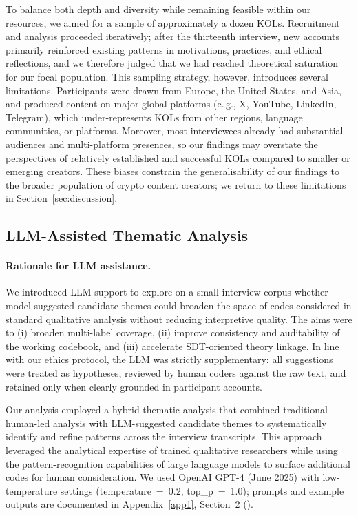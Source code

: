 To balance both depth and diversity while remaining feasible within our resources, we aimed for a sample of approximately a dozen KOLs. Recruitment and analysis proceeded iteratively; after the thirteenth interview, new accounts primarily reinforced existing patterns in motivations, practices, and ethical reflections, and we therefore judged that we had reached theoretical saturation for our focal population. This sampling strategy, however, introduces several limitations. Participants were drawn from Europe, the United States, and Asia, and produced content on major global platforms (e.\,g., X, YouTube, LinkedIn, Telegram), which under-represents KOLs from other regions, language communities, or platforms. Moreover, most interviewees already had substantial audiences and multi-platform presences, so our findings may overstate the perspectives of relatively established and successful KOLs compared to smaller or emerging creators. These biases constrain the generalisability of our findings to the broader population of crypto content creators; we return to these limitations in Section~\ref{sec:discussion}.



\subsection{LLM-Assisted Thematic Analysis}

\paragraph{Rationale for LLM assistance.}
We introduced LLM support to explore on a small interview corpus whether model-suggested candidate themes could broaden the space of codes considered in standard qualitative analysis without reducing interpretive quality. The aims were to (i) broaden multi-label coverage, (ii) improve consistency and auditability of the working codebook, and (iii) accelerate SDT-oriented theory linkage. In line with our ethics protocol, the LLM was strictly supplementary: all suggestions were treated as hypotheses, reviewed by human coders against the raw text, and retained only when clearly grounded in participant accounts.

Our analysis employed a hybrid thematic analysis that combined traditional human-led analysis with LLM-suggested candidate themes to systematically identify and refine patterns across the interview transcripts. This approach leveraged the analytical expertise of trained qualitative researchers while using the pattern-recognition capabilities of large language models to surface additional codes for human consideration. We used OpenAI GPT-4 (June 2025) with low-temperature settings (temperature~=~0.2, top\_p~=~1.0); prompts and example outputs are documented in Appendix~\ref{app1}, Section~2 ().


